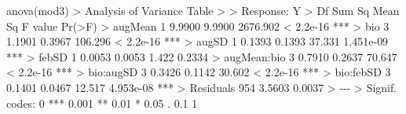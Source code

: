 \documentclass[
  letterpaper,
]{book}
\newenvironment{Shaded}{\begin{snugshade}}{\end{snugshade}}
\newcommand{\DecValTok}[1]{\textcolor[rgb]{0.68,0.00,0.00}{#1}}
\newcommand{\ErrorTok}[1]{\textcolor[rgb]{0.68,0.00,0.00}{#1}}
\newcommand{\FloatTok}[1]{\textcolor[rgb]{0.68,0.00,0.00}{#1}}
\newcommand{\FunctionTok}[1]{\textcolor[rgb]{0.28,0.35,0.67}{#1}}
\newcommand{\NormalTok}[1]{\textcolor[rgb]{0.00,0.23,0.31}{#1}}
\newcommand{\SpecialCharTok}[1]{\textcolor[rgb]{0.37,0.37,0.37}{#1}}
\newcommand{\StringTok}[1]{\textcolor[rgb]{0.13,0.47,0.30}{#1}}
\begin{document}
\begin{Shaded}
\begin{Highlighting}[]
\FunctionTok{anova}\NormalTok{(mod3)}
\SpecialCharTok{\textgreater{}}\NormalTok{ Analysis of Variance Table}
\SpecialCharTok{\textgreater{}} 
\ErrorTok{\textgreater{}}\NormalTok{ Response}\SpecialCharTok{:}\NormalTok{ Y}
\SpecialCharTok{\textgreater{}}\NormalTok{              Df Sum Sq Mean Sq  F value    }\FunctionTok{Pr}\NormalTok{(}\SpecialCharTok{\textgreater{}}\NormalTok{F)    }
\SpecialCharTok{\textgreater{}}\NormalTok{ augMean       }\DecValTok{1} \FloatTok{9.9900}  \FloatTok{9.9900} \FloatTok{2676.902} \SpecialCharTok{\textless{}} \FloatTok{2.2e{-}16} \SpecialCharTok{**}\ErrorTok{*}
\ErrorTok{\textgreater{}}\NormalTok{ bio           }\DecValTok{3} \FloatTok{1.1901}  \FloatTok{0.3967}  \FloatTok{106.296} \SpecialCharTok{\textless{}} \FloatTok{2.2e{-}16} \SpecialCharTok{**}\ErrorTok{*}
\ErrorTok{\textgreater{}}\NormalTok{ augSD         }\DecValTok{1} \FloatTok{0.1393}  \FloatTok{0.1393}   \FloatTok{37.331} \FloatTok{1.451e{-}09} \SpecialCharTok{**}\ErrorTok{*}
\ErrorTok{\textgreater{}}\NormalTok{ febSD         }\DecValTok{1} \FloatTok{0.0053}  \FloatTok{0.0053}    \FloatTok{1.422}    \FloatTok{0.2334}    
\SpecialCharTok{\textgreater{}}\NormalTok{ augMean}\SpecialCharTok{:}\NormalTok{bio   }\DecValTok{3} \FloatTok{0.7910}  \FloatTok{0.2637}   \FloatTok{70.647} \SpecialCharTok{\textless{}} \FloatTok{2.2e{-}16} \SpecialCharTok{**}\ErrorTok{*}
\ErrorTok{\textgreater{}}\NormalTok{ bio}\SpecialCharTok{:}\NormalTok{augSD     }\DecValTok{3} \FloatTok{0.3426}  \FloatTok{0.1142}   \FloatTok{30.602} \SpecialCharTok{\textless{}} \FloatTok{2.2e{-}16} \SpecialCharTok{**}\ErrorTok{*}
\ErrorTok{\textgreater{}}\NormalTok{ bio}\SpecialCharTok{:}\NormalTok{febSD     }\DecValTok{3} \FloatTok{0.1401}  \FloatTok{0.0467}   \FloatTok{12.517} \FloatTok{4.953e{-}08} \SpecialCharTok{**}\ErrorTok{*}
\ErrorTok{\textgreater{}}\NormalTok{ Residuals   }\DecValTok{954} \FloatTok{3.5603}  \FloatTok{0.0037}                       
\SpecialCharTok{\textgreater{}} \SpecialCharTok{{-}{-}{-}}
\ErrorTok{\textgreater{}}\NormalTok{ Signif. codes}\SpecialCharTok{:}  \DecValTok{0} \StringTok{\textquotesingle{}***\textquotesingle{}} \FloatTok{0.001} \StringTok{\textquotesingle{}**\textquotesingle{}} \FloatTok{0.01} \StringTok{\textquotesingle{}*\textquotesingle{}} \FloatTok{0.05} \StringTok{\textquotesingle{}.\textquotesingle{}} \FloatTok{0.1} \StringTok{\textquotesingle{} \textquotesingle{}} \DecValTok{1}
\end{Highlighting}
\end{Shaded}
\end{document}
